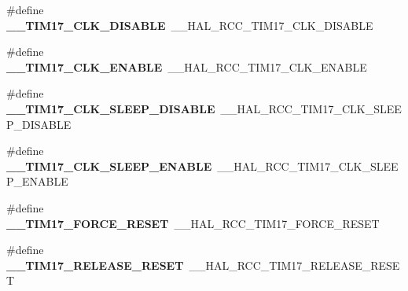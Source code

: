 \begin{DoxyCompactItemize}
\item 
\#define {\bfseries \+\_\+\+\_\+\+T\+I\+M17\+\_\+\+C\+L\+K\+\_\+\+D\+I\+S\+A\+B\+LE}~\+\_\+\+\_\+\+H\+A\+L\+\_\+\+R\+C\+C\+\_\+\+T\+I\+M17\+\_\+\+C\+L\+K\+\_\+\+D\+I\+S\+A\+B\+LE\hypertarget{group___h_a_l___r_c_c___aliased_ga221f536db3bd69c4a9617067509cc328}{}\label{group___h_a_l___r_c_c___aliased_ga221f536db3bd69c4a9617067509cc328}

\item 
\#define {\bfseries \+\_\+\+\_\+\+T\+I\+M17\+\_\+\+C\+L\+K\+\_\+\+E\+N\+A\+B\+LE}~\+\_\+\+\_\+\+H\+A\+L\+\_\+\+R\+C\+C\+\_\+\+T\+I\+M17\+\_\+\+C\+L\+K\+\_\+\+E\+N\+A\+B\+LE\hypertarget{group___h_a_l___r_c_c___aliased_ga0208b98e98d5baeb46f39c7ed5ae3351}{}\label{group___h_a_l___r_c_c___aliased_ga0208b98e98d5baeb46f39c7ed5ae3351}

\item 
\#define {\bfseries \+\_\+\+\_\+\+T\+I\+M17\+\_\+\+C\+L\+K\+\_\+\+S\+L\+E\+E\+P\+\_\+\+D\+I\+S\+A\+B\+LE}~\+\_\+\+\_\+\+H\+A\+L\+\_\+\+R\+C\+C\+\_\+\+T\+I\+M17\+\_\+\+C\+L\+K\+\_\+\+S\+L\+E\+E\+P\+\_\+\+D\+I\+S\+A\+B\+LE\hypertarget{group___h_a_l___r_c_c___aliased_gacad0cfe779960cb0b9444620e6ee7997}{}\label{group___h_a_l___r_c_c___aliased_gacad0cfe779960cb0b9444620e6ee7997}

\item 
\#define {\bfseries \+\_\+\+\_\+\+T\+I\+M17\+\_\+\+C\+L\+K\+\_\+\+S\+L\+E\+E\+P\+\_\+\+E\+N\+A\+B\+LE}~\+\_\+\+\_\+\+H\+A\+L\+\_\+\+R\+C\+C\+\_\+\+T\+I\+M17\+\_\+\+C\+L\+K\+\_\+\+S\+L\+E\+E\+P\+\_\+\+E\+N\+A\+B\+LE\hypertarget{group___h_a_l___r_c_c___aliased_ga7a2dbc1a3fd9cc044f437f3b3760138f}{}\label{group___h_a_l___r_c_c___aliased_ga7a2dbc1a3fd9cc044f437f3b3760138f}

\item 
\#define {\bfseries \+\_\+\+\_\+\+T\+I\+M17\+\_\+\+F\+O\+R\+C\+E\+\_\+\+R\+E\+S\+ET}~\+\_\+\+\_\+\+H\+A\+L\+\_\+\+R\+C\+C\+\_\+\+T\+I\+M17\+\_\+\+F\+O\+R\+C\+E\+\_\+\+R\+E\+S\+ET\hypertarget{group___h_a_l___r_c_c___aliased_ga86bf9b6f86bc9071e215bc664c8e0923}{}\label{group___h_a_l___r_c_c___aliased_ga86bf9b6f86bc9071e215bc664c8e0923}

\item 
\#define {\bfseries \+\_\+\+\_\+\+T\+I\+M17\+\_\+\+R\+E\+L\+E\+A\+S\+E\+\_\+\+R\+E\+S\+ET}~\+\_\+\+\_\+\+H\+A\+L\+\_\+\+R\+C\+C\+\_\+\+T\+I\+M17\+\_\+\+R\+E\+L\+E\+A\+S\+E\+\_\+\+R\+E\+S\+ET\hypertarget{group___h_a_l___r_c_c___aliased_gab8e7ecf7c59c1db06b2ba69bd7527e3f}{}\label{group___h_a_l___r_c_c___aliased_gab8e7ecf7c59c1db06b2ba69bd7527e3f}


\end{DoxyCompactItemize}
